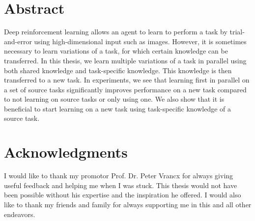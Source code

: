 \documentclass[11pt, a4paper, titlepage, twoside, openright]{book}
\numberwithin{equation}{section}
\providecommand{\keywords}[1]{\textbf{\textit{Index terms---}} #1}
\begin{document}
\frontmatter
\hypersetup{pageanchor=false}

\hypersetup{pageanchor=true}
\setcounter{page}{1}
\chapter*{Abstract}
Deep reinforcement learning allows an agent to learn to perform a task by trial-and-error using high-dimensional input such as images. However, it is sometimes necessary to learn variations of a task, for which certain knowledge can be transferred. In this thesis, we learn multiple variations of a task in parallel using both shared knowledge and task-specific knowledge. This knowledge is then transferred to a new task. In experiments, we see that learning first in parallel on a set of source tasks significantly improves performance on a new task compared to not learning on source tasks or only using one. We also show that it is beneficial to start learning on a new task using task-specific knowledge of a source task.

\chapter*{Acknowledgments}
I would like to thank my promotor Prof. Dr. Peter Vrancx for always giving useful feedback and helping me when I was stuck. This thesis would not have been possible without his expertise and the inspiration he offered.
I would also like to thank my friends and family for always supporting me in this and all other endeavors.


\tableofcontents
\listoffigures
\listofalgorithms
\listoftables

\mainmatter











\backmatter
\printbibliography
\end{document}

